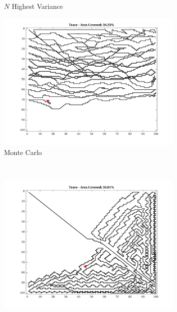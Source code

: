 \begin{figure}[htb!]
\begin{subfigure}[t]{0.3333\textwidth}
        \captionsetup{skip=0.20\baselineskip,size=footnotesize}
        \caption{$N$ Highest Variance}
    \end{subfigure}%
    \begin{subfigure}[t]{0.3333\textwidth}
        \centering
        \includegraphics[width=\linewidth]{figures/hbresults/path_mc_30p_100x100_sf_1_seed_2.png}
        \captionsetup{skip=0.20\baselineskip,size=footnotesize}
        \caption{Monte Carlo}
    \end{subfigure}%
    \\
    \begin{subfigure}[t]{0.3333\textwidth}
        \centering
        \includegraphics[width=\linewidth]{figures/hbresults/path_gradient_30p_100x100_sf_1_seed_2.png}

\end{subfigure}
\end{figure}

